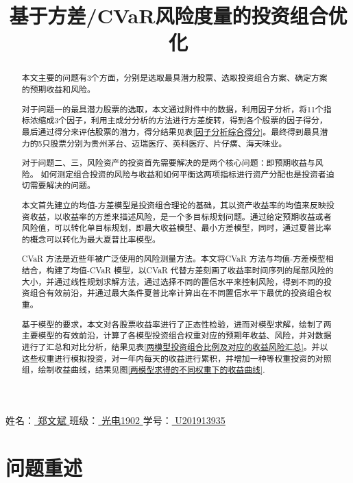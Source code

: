 \documentclass[withoutpreface,bwprint]{cumcmthesis} %
\title{基于方差/CVaR风险度量的投资组合优化}
\begin{document}
	
	\maketitle
		\begin{center}
		姓名：\underline{ 郑文斌 } 班级：\underline{ 光电1902 } 学号：\underline{ U201913935}
	\end{center}
	\begin{abstract}
		本文主要的问题有3个方面，分别是选取最具潜力股票、选取投资组合方案、确定方案的预期收益和风险。
		
		对于问题一的最具潜力股票的选取，本文通过附件中的数据，利用因子分析，将11个指标浓缩成3个因子，利用主成分分析的方法进行方差旋转，得到各个股票的因子得分，最后通过得分来评估股票的潜力，得分结果见表\ref{因子分析综合得分}。最终得到最具潜力的5只股票分别为贵州茅台、迈瑞医疗、英科医疗、片仔癀、海天味业。
		
		对于问题二、三，风险资产的投资首先需要解决的是两个核心问题：即预期收益与风险。 如何测定组合投资的风险与收益和如何平衡这两项指标进行资产分配也是投资者迫切需要解决的问题。
		
		本文首先建立的均值-方差模型是投资组合理论的基础，其以资产收益率的均值来反映投资收益，以收益率的方差来描述风险，是一个多目标规划问题。通过给定预期收益或者风险值，可以转化单目标规划，即最大收益模型、最小方差模型，同时，通过夏普比率的概念可以转化为最大夏普比率模型。
		
		CVaR 方法是近些年被广泛使用的风险测量方法。本文将CVaR 方法与均值-方差模型相结合，构建了均值-CVaR 模型，以CVaR 代替方差刻画了收益率时间序列的尾部风险的大小，并通过线性规划求解方法，通过选择不同的置信水平来控制风险，得到不同的投资组合有效前沿，并通过最大条件夏普比率计算出在不同置信水平下最优的投资组合权重。
		
		基于模型的要求，本文对各股票收益率进行了正态性检验，进而对模型求解，绘制了两主要模型的有效前沿，计算了各模型投资组合权重对应的预期年收益、风险，并对数据进行了汇总和对比分析，结果见表\ref{两模型投资组合比例及对应的收益风险汇总}。并以这些权重进行模拟投资，对一年内每天的收益进行累积，并增加一种等权重投资的对照组，绘制收益曲线，结果见图\ref{两模型求得的不同权重下的收益曲线}.
		
		
	\end{abstract}
	
	\tableofcontents
	
	
	\section{问题重述}
\end{document}
